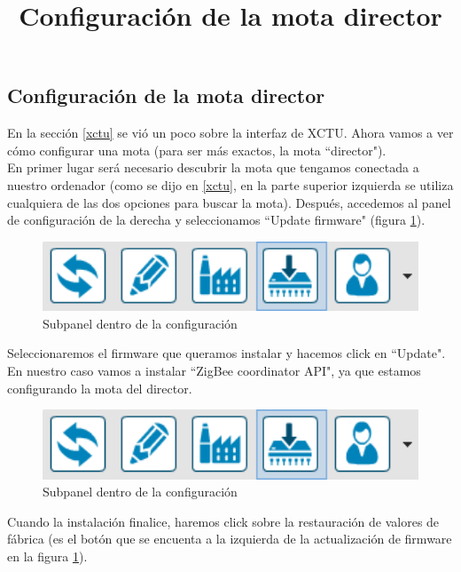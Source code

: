 \subsection{Configuración de la mota director}
\title{Configuración de la mota director}
\label{sec:configuracionmotadirector}

En la sección \ref{xctu} se vió un poco sobre la interfaz de XCTU. Ahora vamos a ver cómo
configurar una mota (para ser más exactos, la mota ``director").\\

En primer lugar será necesario descubrir la mota que tengamos conectada a nuestro ordenador
(como se dijo en \ref{xctu}, en la parte superior izquierda se utiliza cualquiera de las dos
opciones para buscar la mota). Después, accedemos al panel de configuración de la derecha y
seleccionamos ``Update firmware" (figura \ref{fig:configurar_mota_1}).

\begin{figure}[!htb]
\centering
\includegraphics[width=1\textwidth]{./imagenes/configurar_mota_1}
\caption{Subpanel dentro de la configuración} \label{fig:configurar_mota_1}
\end{figure}

Seleccionaremos el firmware que queramos instalar y hacemos click en ``Update".
En nuestro caso vamos a instalar ``ZigBee coordinator API", ya que estamos
configurando la mota del director.

\begin{figure}[!htb]
\centering
\includegraphics[width=1\textwidth]{./imagenes/configurar_mota_1}
\caption{Subpanel dentro de la configuración} \label{fig:configurar_mota_2}
\end{figure}

Cuando la instalación finalice, haremos click sobre la restauración de valores de fábrica
(es el botón que se encuenta a la izquierda de la actualización de firmware en la figura \ref{fig:configurar_mota_1}).\\

